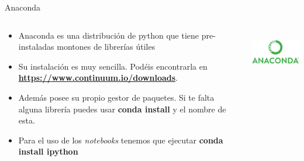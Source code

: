 \documentclass{beamer}
\begin{document}
	\begin{frame}{Anaconda}
		\begin{columns}[T]
			\begin{column}[T]{8cm} 
				\begin{itemize}  
					\item Anaconda es una distribución de python que tiene pre-instaladas montones de librerías útiles 
					\item Su instalación es muy sencilla. Podéis encontrarla en \textbf{\url{https://www.continuum.io/downloads}}.
					\item Además posee su propio gestor de paquetes. Si te falta alguna librería puedes usar \textbf{conda install} 
					y el nombre de esta.
					\item Para el uso de los \textit{notebooks} tenemos que ejecutar \textbf{conda install ipython}
				\end{itemize}
			\end{column}
			
			\begin{column}[T]{5cm}
				\includegraphics[height=2cm]{anaconda.png}
			\end{column}
		\end{columns}
	\end{frame}
\end{document}
